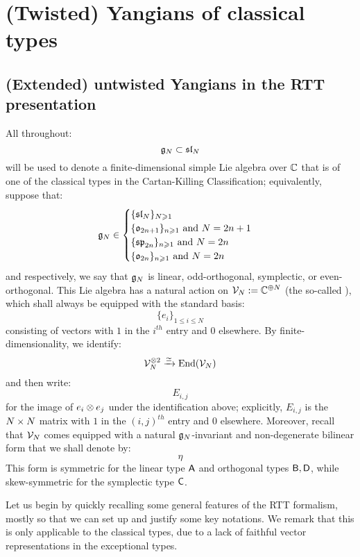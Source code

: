 \section{(Twisted) Yangians of classical types}
    \subsection{(Extended) untwisted Yangians in the RTT presentation}
        All throughout:
            $$\mathfrak{g}_N \subset \mathfrak{sl}_N$$
        will be used to denote a finite-dimensional simple Lie algebra over $\mathbb{C}$ that is of one of the classical types in the Cartan-Killing Classification; equivalently, suppose that:
            $$
                \mathfrak{g}_N \in
                \begin{cases}
                    \text{$\{\mathfrak{sl}_N\}_{N \geqslant 1}$}
                    \\
                    \text{$\{ \mathfrak{o}_{2n + 1} \}_{n \geqslant 1}$ and $N = 2n + 1$}
                    \\
                    \text{$\{ \mathfrak{sp}_{2n} \}_{n \geqslant 1}$ and $N = 2n$}
                    \\
                    \text{$\{ \mathfrak{o}_{2n} \}_{n \geqslant 1}$ and $N = 2n$}
                \end{cases}
            $$
        and respectively, we say that $\mathfrak{g}_N$ is linear, odd-orthogonal, symplectic, or even-orthogonal. This Lie algebra has a natural action on $\mathcal{V}_N := \mathbb{C}^{\oplus N}$ (the so-called ), which shall always be equipped with the standard basis:
            $$\{e_i\}_{1 \leq i \leq N}$$
        consisting of vectors with $1$ in the $i^{th}$ entry and $0$ elsewhere. By finite-dimensionality, we identify:
            $$\calV_N^{\tensor 2} \xrightarrow[]{\cong} \End(\calV_N)$$
        and then write:
            $$E_{i, j}$$
        for the image of $e_i \tensor e_j$ under the identification above; explicitly, $E_{i, j}$ is the $N \x N$ matrix with $1$ in the $(i, j)^{th}$ entry and $0$ elsewhere. Moreover, recall that $\mathcal{V}_N$ comes equipped with a natural $\mathfrak{g}_N$-invariant and non-degenerate bilinear form that we shall denote by:
            $$\eta$$
        This form is symmetric for the linear type $\mathsf{A}$ and orthogonal types $\mathsf{B}, \mathsf{D}$, while skew-symmetric for the symplectic type $\mathsf{C}$.
    
        Let us begin by quickly recalling some general features of the RTT formalism, mostly so that we can set up and justify some key notations. We remark that this is only applicable to the classical types, due to a lack of faithful vector representations in the exceptional types.
            
